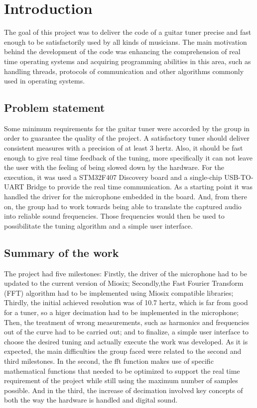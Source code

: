 \section{Introduction}

The goal of this project was to deliver the code of a guitar tuner precise and fast enough to be satisfactorily used by all kinds of musicians. The main motivation behind the development of the code was enhancing the comprehension of real time operating systems and acquiring programming abilities in this area, such as handling threads, protocols of communication and other algorithms commonly used in operating systems.\newline

\subsection{Problem statement}

Some minimum requirements for the guitar tuner were accorded by the group in order to guarantee the quality of the project. A satisfactory tuner should deliver consistent measures with a precision of at least 3 hertz. Also, it should be fast enough to give real time feedback of the tuning, more specifically it can not leave the user with the feeling of being slowed down by the hardware.\newline
For the execution, it was used a STM32F407 Discovery board and a single-chip USB-TO-UART Bridge to provide the real time communication. As a starting point it was handled the driver for the microphone embedded in the board. And, from there on, the group had to work towards being able to translate the captured audio into reliable sound frequencies. Those frequencies would then be used to possibilitate the tuning algorithm and a simple user interface.\newline
  
\subsection{Summary of the work}

The project had five milestones: Firstly, the driver of the microphone had to be updated to the current version of Miosix; Secondly,the Fast Fourier Transform (FFT) algorithm had to be implemented using Miosix compatible libraries; Thirdly, the initial achieved resolution was of 10.7 hertz, which is far from good for a tuner, so a higer decimation had to be implemented in the microphone; Then, the treatment of wrong measurements, such as harmonics and frequencies out of the curve had to be carried out; and to finalize, a simple user interface to choose the desired tuning and actually execute the work was developed.\newline
As it is expected, the main difficulties the group faced were related to the second and third milestones. In the second, the fft function makes use of specific mathematical functions that needed to be optimized to support the real time requirement of the project while still using the maximum number of samples possible. And in the third, the increase of decimation involved key concepts of both the way the hardware is handled and digital sound.
\pagebreak

